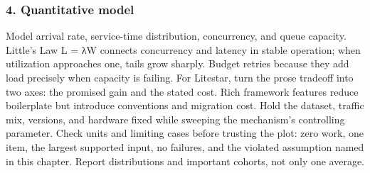 \subsubsection*{4. Quantitative model}
Model arrival rate, service-time distribution, concurrency, and queue capacity. Little's Law L = λW connects concurrency and latency in stable operation; when utilization approaches one, tails grow sharply. Budget retries because they add load precisely when capacity is failing.
For Litestar, turn the prose tradeoff into two axes: the promised gain and the stated cost. Rich framework features reduce boilerplate but introduce conventions and migration cost. Hold the dataset, traffic mix, versions, and hardware fixed while sweeping the mechanism's controlling parameter.
Check units and limiting cases before trusting the plot: zero work, one item, the largest supported input, no failures, and the violated assumption named in this chapter. Report distributions and important cohorts, not only one average.

